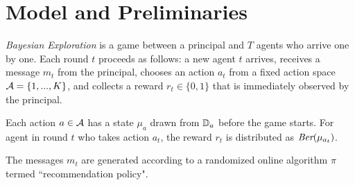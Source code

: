 \section{Model and Preliminaries}
\label{sec:model}

\emph{Bayesian Exploration} is a game between a principal and $T$ agents who arrive one by one. Each round $t$ proceeds as follows: a new agent $t$ arrives, receives a message $m_t$ from the principal, chooses an action $a_t$ from a fixed action space $\mathcal{A} = \{1,...,K\}$, and collects a reward $r_t\in \{0,1\}$ that is immediately observed by the principal. 

Each action $a \in \mathcal{A}$ has a state $\mu_a$ drawn from $\mathbb{D}_a$ before the game starts. For agent in round $t$ who takes action $a_t$, the reward $r_t$ is distributed as $\emph{Ber}(\mu_{a_t})$.  

The messages $m_t$ are generated according to a randomized online algorithm $\pi$ termed ``recommendation policy".

